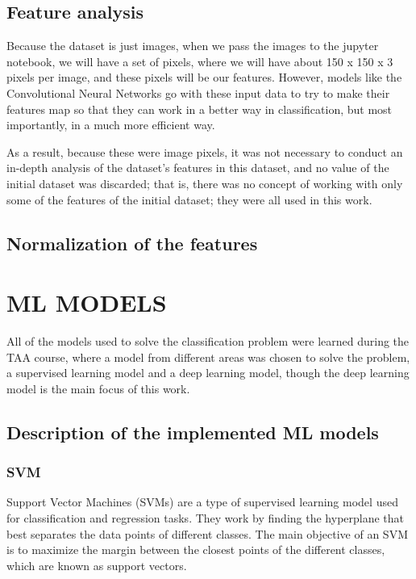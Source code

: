 \documentclass[conference]{IEEEtran}
\begin{document}
\subsection{Feature analysis}

Because the dataset is just images, when we pass the images to the jupyter notebook, we will have a set of pixels, where we will have about 150 x 150 x 3 pixels per image, and these pixels will be our features. However, models like the Convolutional Neural Networks go with these input data to try to make their features map so that they can work in a better way in classification, but most importantly, in a much more efficient way.

As a result, because these were image pixels, it was not necessary to conduct an in-depth analysis of the dataset’s features in this dataset, and no value of the initial dataset was discarded; that is, there was no concept of working with only some of the features of the initial dataset; they were all used in this work.

\subsection{Normalization of the features}

\section{ML MODELS}

All of the models used to solve the classification problem were learned during the TAA course, where a model from different areas was chosen to solve the problem, a supervised learning model and a deep learning model, though the deep learning model is the main focus of this work.

\subsection{Description of the implemented ML models}

\subsubsection{SVM}

Support Vector Machines (SVMs) are a type of supervised learning model used for classification and regression tasks. They work by finding the hyperplane that best separates the data points of different classes. The main objective of an SVM is to maximize the margin between the closest points of the different classes, which are known as support vectors.
\end{document}
